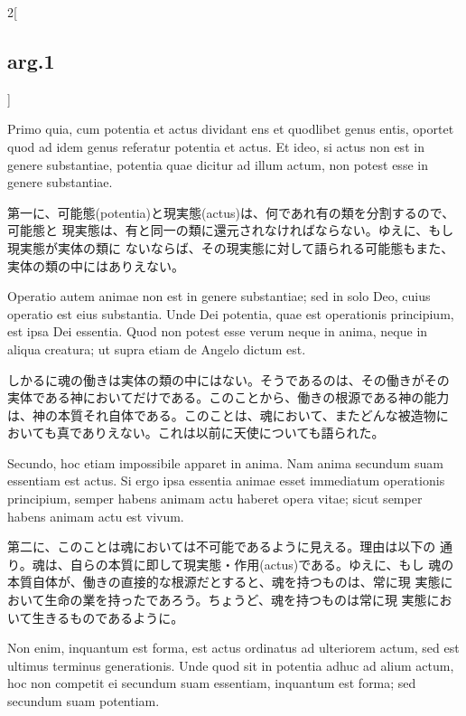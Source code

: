 \documentclass[paper=a4paper,fontsize=10pt,jafontsize=9pt,titlepage]{jlreq}
\begin{document}
\begin{paracol}{2}[\subsection{arg.1}]
\switchcolumn*

 Primo quia, cum potentia et actus dividant ens et quodlibet genus
entis, oportet quod ad idem genus referatur potentia et actus. Et
ideo, si actus non est in genere substantiae, potentia quae dicitur ad
illum actum, non potest esse in genere substantiae.

\switchcolumn

第一に、可能態(potentia)と現実態(actus)は、何であれ有の類を分割するので、可能態と
現実態は、有と同一の類に還元されなければならない。ゆえに、もし現実態が実体の類に
ないならば、その現実態に対して語られる可能態もまた、実体の類の中にはありえない。

\switchcolumn*

 Operatio autem animae non est in genere substantiae; sed in solo Deo,
cuius operatio est eius substantia. Unde Dei potentia, quae est
operationis principium, est ipsa Dei essentia. Quod non potest esse
verum neque in anima, neque in aliqua creatura; ut supra etiam de
Angelo dictum est.

\switchcolumn

しかるに魂の働きは実体の類の中にはない。そうであるのは、その働きがその
実体である神においてだけである。このことから、働きの根源である神の能力
は、神の本質それ自体である。このことは、魂において、またどんな被造物に
おいても真でありえない。これは以前に天使についても語られた。


\switchcolumn*


Secundo, hoc etiam impossibile apparet in anima.  Nam anima secundum
suam essentiam est actus. Si ergo ipsa essentia animae esset
immediatum operationis principium, semper habens animam actu haberet
opera vitae; sicut semper habens animam actu est vivum.


\switchcolumn

 第二に、このことは魂においては不可能であるように見える。理由は以下の
 通り。魂は、自らの本質に即して現実態・作用(actus)である。ゆえに、もし
 魂の本質自体が、働きの直接的な根源だとすると、魂を持つものは、常に現
 実態において生命の業を持ったであろう。ちょうど、魂を持つものは常に現
 実態において生きるものであるように。


\switchcolumn*


 Non enim, inquantum est forma, est actus ordinatus ad ulteriorem
actum, sed est ultimus terminus generationis. Unde quod sit in
potentia adhuc ad alium actum, hoc non competit ei secundum suam
essentiam, inquantum est forma; sed secundum suam potentiam.

\switchcolumn



\end{paracol}
\end{document}
